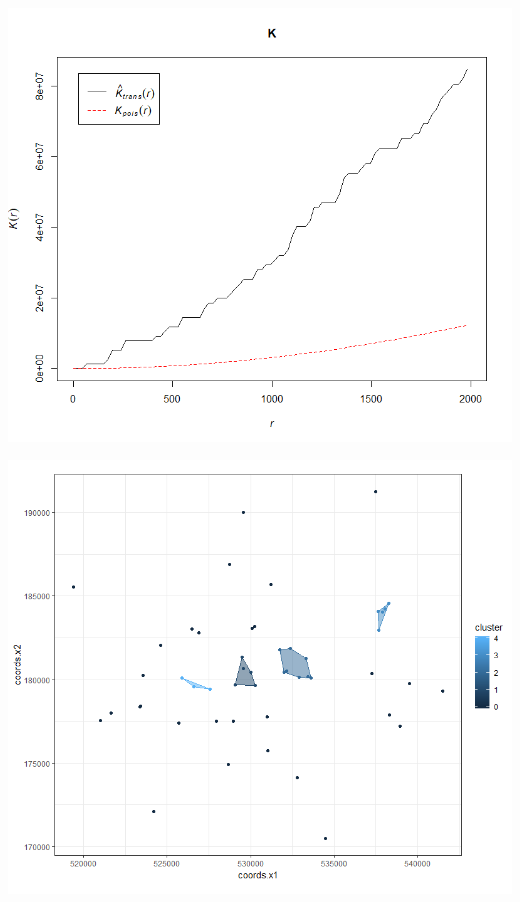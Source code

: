 \documentclass[]{article}
\begin{document}
\includegraphics[width=11.17in]{8}

\includegraphics[width=11.17in]{9}
\end{document}
